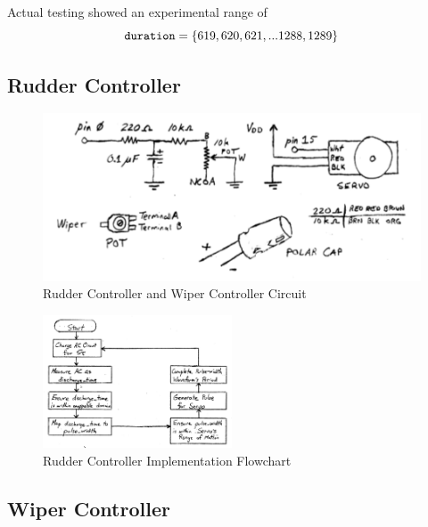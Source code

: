 \documentclass[11pt]{article}
\begin{document}
Actual testing showed an experimental range of
\begin{equation}
\textrm{\texttt{duration}}=\{619, 620, 621,...1288, 1289\}
\end{equation}

\subsection{Rudder Controller}

\begin{figure}[h!]
\centering
\includegraphics[width=.7\textwidth]{rudder-circuit.pdf}
\caption{Rudder Controller and Wiper Controller Circuit}
\label{rudder-circuit}
\end{figure}

\begin{figure}[ht]
\centering
\includegraphics[width=0.5\textwidth]{rudder-flowchart.pdf}
\caption{Rudder Controller Implementation Flowchart}
\label{rudder-flowchart}
\end{figure}

\subsection{Wiper Controller}
\end{document}
